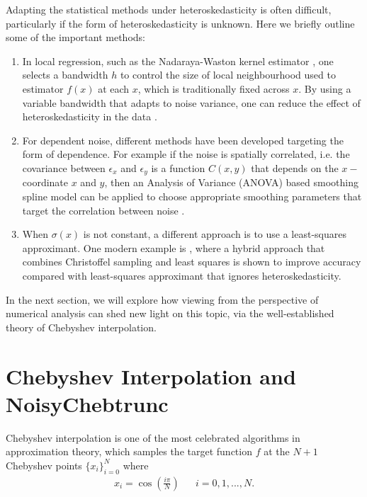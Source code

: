 \documentclass[pdflatex,sn-mathphys-num]{sn-jnl}%
\theoremstyle{thmstyleone}%
\theoremstyle{thmstyletwo}%
\theoremstyle{thmstylethree}%
\begin{document}
\begin{enumerate}
	Adapting the statistical methods under heteroskedasticity is often difficult, particularly if the form of heteroskedasticity is unknown. Here we briefly outline some of the important methods:
	\begin{enumerate}
		\item In local regression, such as the Nadaraya-Waston kernel estimator \cite{wasserman}, one selects a bandwidth $h$ to control the size of local neighbourhood used to estimator $f(x)$ at each $x$, which is traditionally fixed across $x$. By using a variable bandwidth that adapts to noise variance, one can reduce the effect of heteroskedasticity in the data \cite{fan-and-gilbels,wasserman}.
		\item For dependent noise, different methods have been developed targeting the form of dependence. For example if the noise is spatially correlated, i.e. the covariance between $\epsilon_x$ and $\epsilon_y$ is a function $C(x,y)$ that depends on the $x-$coordinate $x$ and $y$, then an Analysis of Variance (ANOVA) based smoothing spline model can be applied to choose appropriate smoothing parameters that target the correlation between noise \cite{correlated-error}.
		\item When $\sigma(x)$ is not constant, a different approach is to use a least-squares approximant. One modern example is \cite{least_square}, where a hybrid approach that combines Christoffel sampling and least squares is shown to improve accuracy compared with least-squares approximant that ignores heteroskedasticity.
	\end{enumerate}
\end{enumerate}

In the next section, we will explore how viewing from the perspective of numerical analysis can shed new light on this topic, via the well-established theory of Chebyshev interpolation.

\section{Chebyshev Interpolation and NoisyChebtrunc}\label{sec:chebandnoisy}

Chebyshev interpolation is one of the most celebrated algorithms in approximation theory, which samples the target function $f $ at the $N+1$ Chebyshev points $\{x_i\}_{i=0}^N$ where
\begin{align*}
	x_i = \cos(\frac{i\pi}{N}) && i = 0, 1,...,N.
\end{align*}
\end{document}
